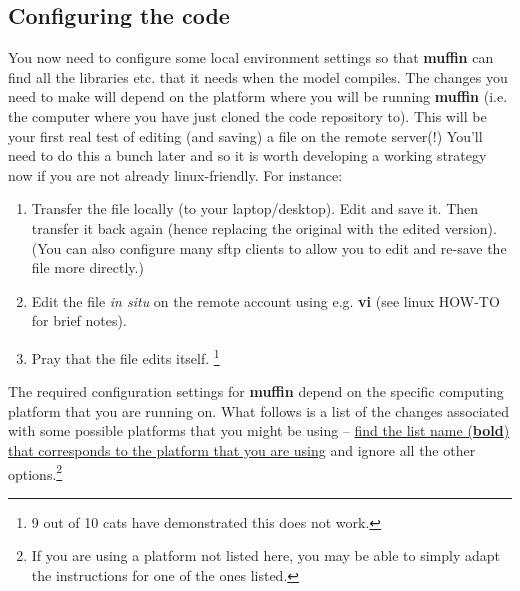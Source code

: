 \documentclass[11pt,fleqn]{book} %
\begin{document}

\subsection{Configuring the code}

\noindent You now need to configure some local environment settings so that \textbf{muffin} can find all the libraries etc. that it needs when the model compiles. The changes you need to make will depend on the platform where you will be running \textbf{muffin} (i.e. the computer where you have just cloned the code repository to). This will be your first real test of editing (and saving) a file on the remote server(!) You'll need to do this a bunch later and so it is worth developing a working strategy now if you are not already linux-friendly. For instance:

\begin{enumerate}[noitemsep]
\vspace{1mm}
\item Transfer the file locally (to your laptop/desktop). Edit and save it. Then transfer it back again (hence replacing the original with the edited version). (You can also configure many sftp clients to allow you to edit and re-save the file more directly.)
\vspace{1mm}
\item Edit the file \textit{in situ} on the remote account using e.g. \textbf{vi} (see linux HOW-TO for brief notes).
\vspace{1mm}
\item Pray that the file edits itself. \footnote{9 out of 10 cats have demonstrated this does not work.}
\end{enumerate}

\vspace{1mm}
\noindent The required configuration settings for \textbf{muffin} depend on the specific computing platform that you are running on. What follows is a list of the changes associated with some possible platforms that you might be using -- \uline{find the list name (\textbf{bold}) that corresponds to the platform that you are using} and ignore all the other options.\footnote{If you are using a platform not listed here, you may be able to simply adapt the instructions for one of the ones listed.}
\end{document}
